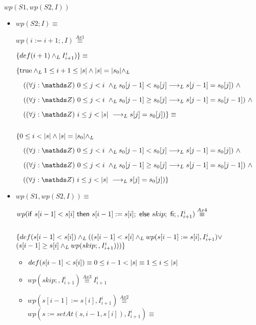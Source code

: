 \documentclass{article}
\begin{document}
$wp(S1, wp(S2, I))$

\begin{itemize}
    \item $wp(S2; I) \equiv$

    $wp(i := i + 1;, I) \stackrel{Ax1}{\equiv}$

    $\{def(i + 1) \land _L I_{i+1}^{i})\} \equiv$

    $ \{\mathrm{true} \land _L 1 \leq i+1 \leq |s| \wedge |s| = |s_0| \land _L$

    $\quad (\paraTodo{j}{0}{i} \yLuego s_0[j-1] < s_0[j] \implicaLuego s[j-1] = s_0[j])\ \wedge $

    $\quad (\paraTodo{j}{0}{i} \yLuego s_0[j-1] \geq s_0[j] \implicaLuego s[j-1] = s_0[j-1])\ \wedge$

    $\quad (\paraTodo{j}{i}{\longitud{s}} \implicaLuego s[j] = s_0[j])\} \equiv $

    $ $

    $ \{0 \leq i < |s| \wedge |s| = |s_0| \land _L$

    $\quad (\paraTodo{j}{0}{i} \yLuego s_0[j-1] < s_0[j] \implicaLuego s[j-1] = s_0[j])\ \wedge $

    $\quad (\paraTodo{j}{0}{i} \yLuego s_0[j-1] \geq s_0[j] \implicaLuego s[j-1] = s_0[j-1])\ \wedge$

    $\quad (\paraTodo{j}{i}{\longitud{s}} \implicaLuego s[j] = s_0[j])\} $

    \item $wp(S1, wp(S2, I)) \equiv$

    $ wp(\mathsf{if}\ s[i-1] < s[i]\ \mathsf{then}\ s[i-1]:= s[i];\ \mathsf{else}\ skip;\ \mathsf{fi};, I_{i+1}^{i}) \stackrel{Ax4}{\equiv}$

    $ $

    $ \{ def(s[i-1] < s[i]) \land _L ((s[i-1] < s[i] \land _L wp(s[i-1]:=s[i], I_{i+1}^{i}) \vee $
    $ ( s[i-1] \geq s[i] \land _L wp(skip;, I_{i+1}^{i}))) \} $

    \begin{itemize}
        \item $def(s[i-1] < s[i]) \equiv 0 \leq i-1 < |s| \equiv 1 \leq i \leq |s| $

        \item $wp(skip;, I_{i+1}^{i}) \stackrel{Ax3}{\equiv} I_{i+1}^{i} $

        \item $wp(s[i-1]:=s[i], I_{i+1}^{i}) \stackrel{Ax2}{\equiv} $
        $ wp(s:=setAt(s,i-1, s[i]), I_{i+1}^{i}) \equiv $


\end{itemize}
\end{itemize}
\end{document}
